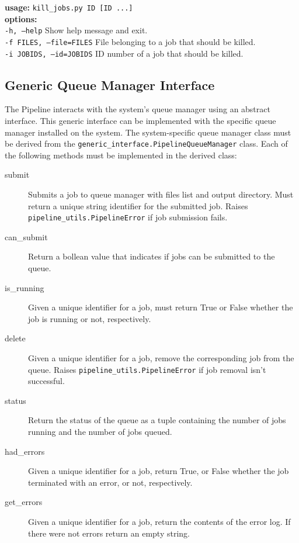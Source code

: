 \documentclass[12pt]{article}
\begin{document}
\begin{itemize}
        \textbf{usage:} \texttt{kill\_jobs.py ID [ID ...]} \\
        \textbf{options:} \\
          \texttt{-h, --help}            Show help message and exit. \\
          \texttt{-f FILES, --file=FILES}  File belonging to a job that should be killed. \\
          \texttt{-i JOBIDS, --id=JOBIDS}  ID number of a job that should be killed.

\end{itemize}

\subsection{Generic Queue Manager Interface}
The Pipeline interacts with the system's queue manager using an abstract interface. This generic interface can be implemented with the specific queue manager installed on the system. The system-specific queue manager class must be derived from the \texttt{generic\_interface.PipelineQueueManager} class. Each of the following methods must be implemented in the derived class:

\begin{description}
    \item[submit] Submits a job to queue manager with files list and output directory. Must return a unique string identifier for the submitted job. Raises \texttt{pipeline\_utils.PipelineError} if job submission fails.

    \item[can\_submit] Return a bollean value that indicates if jobs can be submitted to the queue.
    
    \item[is\_running] Given a unique identifier for a job, must return True or False whether the job is running or not, respectively.

    \item[delete] Given a unique identifier for a job, remove the corresponding job from the queue. Raises \texttt{pipeline\_utils.PipelineError} if job removal isn't successful.

    \item[status] Return the status of the queue as a tuple containing the number of jobs running and the number of jobs queued.

    \item[had\_errors] Given a unique identifier for a job, return True, or False whether the job terminated with an error, or not, respectively.

    \item[get\_errors] Given a unique identifier for a job, return the contents of the error log. If there were not errors return an empty string.
\end{description}
\end{document}
